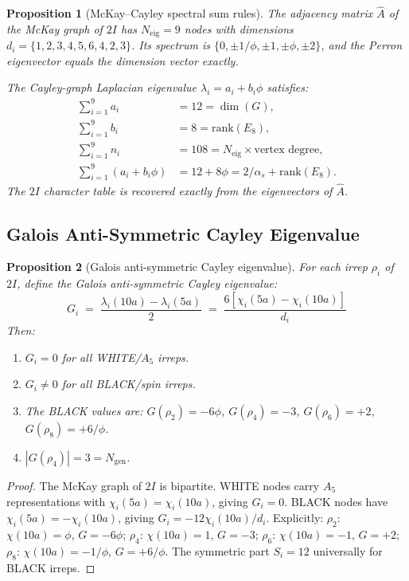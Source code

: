 \documentclass[12pt,a4paper]{article}
\newtheorem{proposition}{Proposition}
\theoremstyle{definition}
\begin{document}
\begin{proposition}[McKay--Cayley spectral sum rules]\label{prop:S-mckay-sumrules}
The adjacency matrix $\hat{A}$ of the McKay graph of $2I$ has $N_{\mathrm{eig}} = 9$ nodes with dimensions $d_i = \{1, 2, 3, 4, 5, 6, 4, 2, 3\}$.  Its spectrum is $\{0, \pm 1/\phi, \pm 1, \pm \phi, \pm 2\}$, and the Perron eigenvector equals the dimension vector exactly.

The Cayley-graph Laplacian eigenvalue $\lambda_i = a_i + b_i\phi$ satisfies:
\begin{align}
\sum_{i=1}^{9} a_i &= 12 = \dim(G), \\
\sum_{i=1}^{9} b_i &= 8 = \mathrm{rank}(E_8), \\
\sum_{i=1}^{9} n_i &= 108 = N_{\mathrm{eig}} \times \text{vertex degree}, \\
\sum_{i=1}^{9} (a_i + b_i\phi) &= 12 + 8\phi = 2/\alpha_s + \mathrm{rank}(E_8).
\end{align}
The $2I$ character table is recovered exactly from the eigenvectors of $\hat{A}$.
\end{proposition}

\subsection{Galois Anti-Symmetric Cayley Eigenvalue}

\begin{proposition}[Galois anti-symmetric Cayley eigenvalue]\label{prop:S-galois-antisym}
For each irrep $\rho_i$ of $2I$, define the \emph{Galois anti-symmetric Cayley eigenvalue}:
\begin{equation}
G_i \;=\; \frac{\lambda_i(10a) - \lambda_i(5a)}{2} \;=\; \frac{6[\chi_i(5a) - \chi_i(10a)]}{d_i}
\end{equation}
Then:
\begin{enumerate}
\item[\textup{(i)}] $G_i = 0$ for all WHITE/$A_5$ irreps.
\item[\textup{(ii)}] $G_i \neq 0$ for all BLACK/spin irreps.
\item[\textup{(iii)}] The BLACK values are:
$G(\rho_2) = -6\phi$, $G(\rho_4) = -3$, $G(\rho_6) = +2$, $G(\rho_8) = +6/\phi$.
\item[\textup{(iv)}] $|G(\rho_4)| = 3 = N_{\text{gen}}$.
\end{enumerate}
\end{proposition}

\begin{proof}
The McKay graph of $2I$ is bipartite.  WHITE nodes carry $A_5$ representations with $\chi_i(5a) = \chi_i(10a)$, giving $G_i = 0$.  BLACK nodes have $\chi_i(5a) = -\chi_i(10a)$, giving $G_i = -12\chi_i(10a)/d_i$.
Explicitly:
$\rho_2$: $\chi(10a) = \phi$, $G = -6\phi$;
$\rho_4$: $\chi(10a) = 1$, $G = -3$;
$\rho_6$: $\chi(10a) = -1$, $G = +2$;
$\rho_8$: $\chi(10a) = -1/\phi$, $G = +6/\phi$.
The symmetric part $S_i = 12$ universally for BLACK irreps.
\end{proof}
\end{document}
